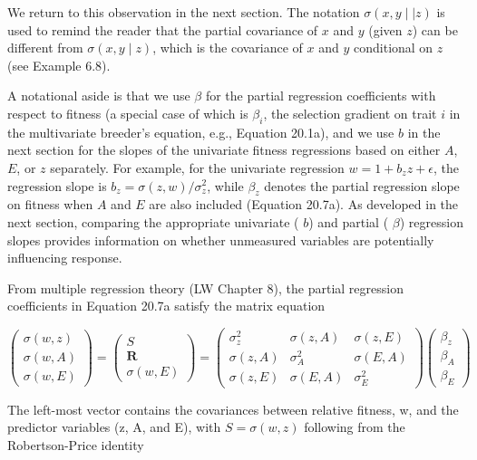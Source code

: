 \documentclass{article}
\begin{document}
We return to this observation in the next section. The notation  $ \sigma(x, y \mid \mid z) $ is used to remind the reader that the partial covariance of  $ x $ and  $ y $ (given  $ z $) can be different from  $ \sigma(x, y \mid z) $, which is the covariance of  $ x $ and  $ y $ conditional on  $ z $ (see Example 6.8).

A notational aside is that we use  $ \beta $ for the partial regression coefficients with respect to fitness (a special case of which is  $ \beta_i $, the selection gradient on trait  $ i $ in the multivariate breeder's equation, e.g., Equation 20.1a), and we use  $ b $ in the next section for the slopes of the univariate fitness regressions based on either  $ A $,  $ E $, or  $ z $ separately. For example, for the univariate regression  $ w = 1 + b_z z + \epsilon $, the regression slope is  $ b_z = \sigma(z, w)/\sigma_z^2 $, while  $ \beta_z $ denotes the partial regression slope on fitness when  $ A $ and  $ E $ are also included (Equation 20.7a). As developed in the next section, comparing the appropriate univariate ( $ b $) and partial ( $ \beta $) regression slopes provides information on whether unmeasured variables are potentially influencing response.

From multiple regression theory (LW Chapter 8), the partial regression coefficients in Equation 20.7a satisfy the matrix equation

\begin{equation}
\begin{pmatrix}\sigma(w,z)\\\sigma(w,A)\\\sigma(w,E)\end{pmatrix}=\begin{pmatrix}S\\\boldsymbol{R}\\\sigma(w,E)\end{pmatrix}=\begin{pmatrix}\sigma_{z}^{2}&\sigma(z,A)&\sigma(z,E)\\\sigma(z,A)&\sigma_{A}^{2}&\sigma(E,A)\\\sigma(z,E)&\sigma(E,A)&\sigma_{E}^{2}\end{pmatrix}\begin{pmatrix}\beta_{z}\\\beta_{A}\\\beta_{E}\end{pmatrix}
\tag{20.8a}
\label{eq:20_8a}
\end{equation}

The left-most vector contains the covariances between relative fitness, w, and the predictor variables (z, A, and E), with  $ S = \sigma(w, z) $ following from the Robertson-Price identity
\end{document}
